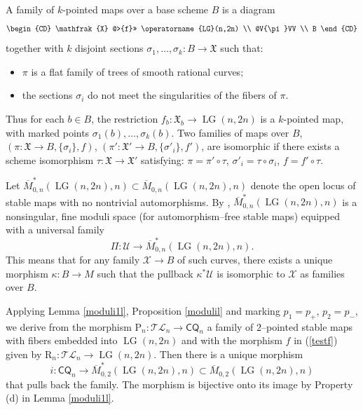 \documentclass[10pt]{amsart}
\theoremstyle{definition}
\newcommand{\Mbar}{\overline{M}}
\newcommand{\LG}{\operatorname{LG}}
\newcommand{\CQ}{\mathsf{CQ}}
\newcommand{\TL}{\mathcal{TL}}
\newcommand{\RL}{\mathrm{R}}
\newcommand{\PL}{\mathrm{P}}
\theoremstyle{plain} %
\begin{document}
A family of $k$-pointed maps over a base scheme $B$ is a diagram
\begin{equation}\label{testf}
\begin{CD}
\mathfrak{X} @>{f}>> \LG(n,2n) \\
@V{\pi}VV \\
B
\end{CD}
\end{equation}
together with $k$ disjoint sections $\sigma_1,\dots,\sigma_k \colon B \to \mathfrak{X}$ such that:
\begin{itemize}
    \item[-] $\pi$ is a flat family of trees of smooth rational curves;
    \item[-] the sections $\sigma_i$ do not meet the singularities of the fibers of $\pi$.
\end{itemize}
Thus for each $b \in B$, the restriction $f_b\colon \mathfrak{X}_b \to \LG(n,2n)$ is a $k$-pointed map, with marked points $\sigma_1(b),\dots,\sigma_k(b)$.  Two families of maps over \( B \),
$(\pi\colon\mathfrak X \to B, \{\sigma_i\}, f)$,  $(\pi' : \mathfrak X' \to B, \{\sigma'_i\}, f')$,
are isomorphic if there exists a scheme isomorphism \(\tau : \mathfrak X \to \mathfrak X'\) satisfying: \(\pi = \pi' \circ \tau\), \(\sigma'_i = \tau \circ \sigma_i\), \(f = f' \circ \tau\). 

Let \(\Mbar_{0,n}^*(\LG(n,2n), n) \subset \Mbar_{0,n}(\LG(n,2n), n) \) denote the open locus of stable maps with no nontrivial automorphisms. By \cite[Theorem 2]{FP97},
\( \overline{M}_{0,n}^*(\LG(n,2n), n) \) is a nonsingular, fine moduli space (for automorphism--free stable maps) equipped with a universal family
\begin{equation}
 \Pi\colon \mathcal U\rightarrow \overline{M}_{0,n}^*(\LG(n,2n), n).  
\end{equation}
This means that for any family \( \mathcal{X} \to B \) of such curves, there exists a unique morphism  $\kappa\colon B \to M$ such that the pullback \( \kappa^*\mathcal{U} \) is isomorphic to \( \mathcal{X} \) as families over \( B \). 


Applying Lemma \ref{moduli1l}, Proposition \ref{modulil} and marking $p_1 = p_+$, $p_2 = p_-$, we derive from the morphism $\PL_n \colon \TL_n \rightarrow \CQ_n$ a family of $2$--pointed stable maps with fibers embedded into $\LG(n,2n)$ and with the morphism $f$ in (\ref{testf}) given by $\RL_n\colon\TL_n\rightarrow\LG(n,2n)$. Then there is a unique morphism \begin{equation}\label{iem}
i\colon\CQ_n\rightarrow\overline{M}_{0,2}^*(\LG(n,2n), n)\subset \Mbar_{0,2}(\LG(n,2n), n)   
\end{equation} that pulls back the family. The morphism is bijective onto its image by Property (d) in Lemma \ref{moduli1l}. 
\end{document}
